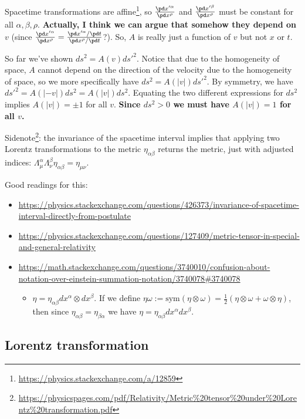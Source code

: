 Spacetime transformations are affine\footnote{\url{https://physics.stackexchange.com/a/12859}}, so $\frac{\pd x'^\alpha}{\pd x^\rho}$ and $\frac{\pd x'^\beta}{\pd x^\rho}$ must be constant for all $\alpha, \beta, \rho$. \textbf{Actually, I think we can argue that somehow they depend on $v$} (since $\frac{\pd x'^\alpha}{\pd x^\rho} = \frac{\pd x'^\alpha/\pd t}{\pd x^\rho/\pd t}$?). So, $A$ is really just a function of $v$ but not $x$ or $t$.

So far we've shown $ds^2 = A(v) ds'^2$. Notice that due to the homogeneity of space, $A$ cannot depend on the direction of the velocity due to the homogeneity of space, so we more specifically have $ds^2 = A(|v|) ds'^2$. By symmetry, we have $ds'^2 = A(|-v|) ds^2 = A(|v|) ds^2$. Equating the two different expressions for $ds^2$ implies $A(|v|) = \pm 1$ for all $v$. \textbf{Since $ds^2 > 0$ we must have $A(|v|) = 1$ for all $v$.}


Sidenote\footnote{\url{https://physicspages.com/pdf/Relativity/Metric\%20tensor\%20under\%20Lorentz\%20transformation.pdf}}: the invariance of the spacetime interval implies that applying two Lorentz transformations to the metric $\eta_{\alpha \beta}$ returns the metric, just with adjusted indices: $\Lambda^\alpha_\mu \Lambda^\beta_\nu \eta_{\alpha \beta} = \eta_{\mu \nu}$.



Good readings for this:

\begin{itemize}
	\item \url{https://physics.stackexchange.com/questions/426373/invariance-of-spacetime-interval-directly-from-postulate}
	\item \url{https://physics.stackexchange.com/questions/127409/metric-tensor-in-special-and-general-relativity}
	\item \url{https://math.stackexchange.com/questions/3740010/confusion-about-notation-over-einstein-summation-notation/3740078#3740078}
	\begin{itemize}
		\item $\eta = \eta_{\alpha \beta} dx^\alpha \otimes dx^\beta$. If we define $\eta \omega := \text{sym}(\eta \otimes \omega) = \frac{1}{2}(\eta \otimes \omega + \omega \otimes \eta)$, then since $\eta_{\alpha \beta} = \eta_{\beta \alpha}$ we have $\eta = \eta_{\alpha \beta} dx^\alpha dx^\beta$.
	\end{itemize}
\end{itemize}

\subsection*{Lorentz transformation}

